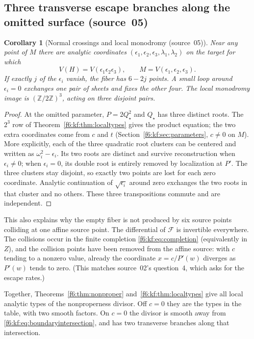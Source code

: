 \documentclass[11pt,a4paper]{article}
\newtheorem{corollary}[theorem]{Corollary}
\theoremstyle{definition}
\newcommand{\Z}{\mathbb Z}
\newcommand{\F}{\mathcal F}
\newcommand{\src}[1]{\textup{(source~#1)}}
\begin{document}
\subsection{Three transverse escape branches along the omitted surface
\src{05}}
\begin{corollary}[Normal crossings and local monodromy \src{05}]
\label{f6:kf:cor:crossings}
Near any point of $M$ there are analytic coordinates
$(\epsilon_1,\epsilon_2,\epsilon_3,\lambda_1,\lambda_2)$ on the target for
which
\[
V(H)=V(\epsilon_1\epsilon_2\epsilon_3),\qquad M=V(\epsilon_1,\epsilon_2,\epsilon_3).
\]
If exactly $j$ of the $\epsilon_i$ vanish, the fiber has $6-2j$ points. A
small loop around $\epsilon_i=0$ exchanges one pair of sheets and fixes the
other four. The local monodromy image is $(\Z/2\Z)^3$, acting on three
disjoint pairs.
\end{corollary}
\begin{proof}
At the omitted parameter, $P=2Q_\star^2$ and $Q_\star$ has three distinct
roots. The $2^3$ row of Theorem~\ref{f6:kf:thm:localtypes} gives the product
equation; the two extra coordinates come from $c$ and $t$
(Section~\ref{f6:kf:sec:parameters}, $c\ne0$ on $M$). More explicitly, each
of the three quadratic root clusters can be centered and written as
$\omega_i^2-\epsilon_i$. Its two roots are distinct and survive
reconstruction when $\epsilon_i\ne0$; when $\epsilon_i=0$, its double root is
entirely removed by localization at $P'$. The three clusters stay disjoint,
so exactly two points are lost for each zero coordinate. Analytic
continuation of $\sqrt{\epsilon_i}$ around zero exchanges the two roots in
that cluster and no others. These three transpositions commute and are
independent.
\end{proof}

This also explains why the empty fiber is not produced by six source points
colliding at one affine source point. The differential of $\F$ is invertible
everywhere. The collisions occur in the finite completion
\eqref{f6:kf:eq:completion} (equivalently in $Z$), and the collision points
have been removed from the affine source: with $c$ tending to a nonzero
value, already the coordinate $x=c/P'(w)$ diverges as $P'(w)$ tends to zero.
(This matches source~02's question~4, which asks for the escape rates.)

Together, Theorems~\ref{f6:thm:nonproper} and~\ref{f6:kf:thm:localtypes} give
all local analytic types of the nonproperness divisor. Off $c=0$ they are
the types in the table, with two smooth factors. On $c=0$ the divisor is
smooth away from \eqref{f6:kf:eq:boundaryintersection}, and has two
transverse branches along that intersection.
\end{document}
